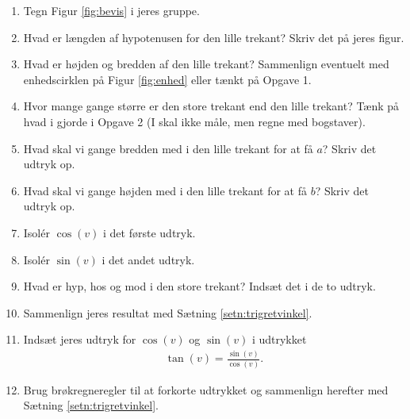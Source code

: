 \documentclass[12pt]{article}
\begin{document}
\begin{enumerate}[label=\roman*)]
	\item Tegn Figur \ref{fig:bevis} i jeres gruppe. 
	\item Hvad er længden af hypotenusen for den lille trekant? Skriv det på jeres figur.
	\item Hvad er højden og bredden af den lille trekant? Sammenlign eventuelt med enhedscirklen på Figur \ref{fig:enhed} eller tænkt på Opgave 1. 
	\item Hvor mange gange større er den store trekant end den lille trekant? Tænk på hvad i gjorde i Opgave 2 (I skal ikke måle, men regne med bogstaver).
	\item Hvad skal vi gange bredden med i den lille trekant for at få $a$? Skriv det udtryk op.
	\item Hvad skal vi gange højden med i den lille trekant for at få $b$? Skriv det udtryk op.
	\item Isolér $\cos(v)$ i det første udtryk. 
	\item Isolér $\sin(v)$ i det andet udtryk. 
	\item Hvad er hyp, hos og mod i den store trekant? Indsæt det i de to udtryk. 
	\item Sammenlign jeres resultat med Sætning \ref{setn:trigretvinkel}.
	\item Indsæt jeres udtryk for $\cos(v)$ og $\sin(v)$ i udtrykket
	\begin{align*}
		\tan(v) = \frac{\sin(v)}{\cos(v)}.	
	\end{align*}	 
	\item Brug brøkregneregler til at forkorte udtrykket og sammenlign herefter med Sætning \ref{setn:trigretvinkel}.
\end{enumerate}

\newpage
\end{document}
